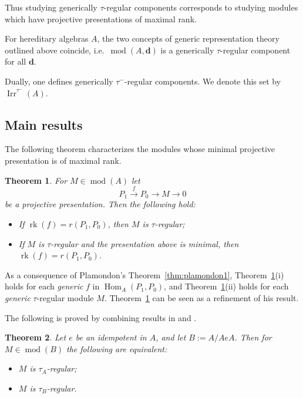 \documentclass[12pt,reqno]{amsart}
\newtheorem{Thm}{Theorem}[section]
\theoremstyle{definition}
\newcommand{\bd}{\mathbf{d}}
\newcommand{\rk}{\operatorname{rk}}
\newcommand{\md}{\operatorname{mod}}
\newcommand{\Hom}{\operatorname{Hom}}
\newcommand{\irr}{\operatorname{Irr}}
\begin{document}
Thus studying generically $\tau$-regular components corresponds to studying modules which have projective presentations of maximal rank.

For hereditary algebras $A$, the two concepts of generic representation theory outlined above coincide,
i.e.\ $\md(A,\bd)$ is a generically $\tau$-regular component for
all $\bd$.

Dually, one defines generically $\tau^-$-regular components.
We denote this set by $\irr^{\tau^-}(A)$.

\subsection{Main results}
The following theorem characterizes the modules whose
minimal
projective presentation is of maximal rank.


\begin{Thm}\label{thm:main0}
For $M \in \md(A)$ let
$$
P_1 \xrightarrow{f} P_0 \to M \to 0
$$
be a projective presentation.
Then
the following hold:
\begin{itemize}\itemsep2mm

\item[(i)]
If $\rk(f) = r(P_1,P_0)$, then $M$ is $\tau$-regular;

\item[(ii)]
If $M$ is $\tau$-regular and the presentation above is minimal,
then $\rk(f) = r(P_1,P_0)$.

\end{itemize}
\end{Thm}

As a consequence of
Plamondon's Theorem~\ref{thm:plamondon1},
Theorem~\ref{thm:main0}(i) holds
for
each \emph{generic} $f$ in $\Hom_A(P_1,P_0)$,
and
Theorem~\ref{thm:main0}(ii) holds
for each \emph{generic} $\tau$-regular module $M$.
Theorem~\ref{thm:main0} can be seen as a refinement of his result.

The following is proved by combining results in \cite{AR77} and
\cite{APT92}.

\begin{Thm} \label{thm:main6A}
Let $e$ be an idempotent in $A$, and let $B := A/AeA$.
Then for $M \in \md(B)$ the following are equivalent:
\begin{itemize}\itemsep2mm

\item[(i)]
$M$ is $\tau_A$-regular;

\item[(ii)]
$M$ is $\tau_B$-regular.

\end{itemize}
\end{Thm}
\end{document}
